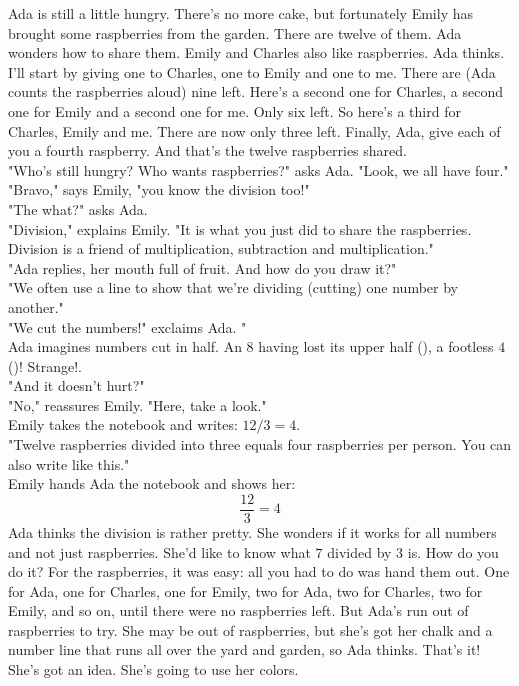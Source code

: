 Ada is still a little hungry.
There's no more cake, but fortunately Emily has brought some raspberries from the garden.
There are twelve of them. Ada wonders how to share them. 
Emily and Charles also like raspberries. 
Ada thinks. I'll start by giving one to Charles, one to Emily and one to me. 
There are (Ada counts the raspberries aloud) nine left. 
Here's a second one for Charles, a second one for Emily and a second one for me. Only six left. 
So here's a third for Charles, Emily and me. There are now only three left. 
Finally, Ada, give each of you a fourth raspberry. And that's the twelve raspberries shared.\\
"Who's still hungry? Who wants raspberries?" asks Ada. "Look, we all have four."\\
"Bravo," says Emily, "you know the division too!"\\
"The what?" asks Ada.\\
"Division," explains Emily. "It is what you just did to share the raspberries. Division is a friend of multiplication, subtraction and multiplication."\\
"Ada replies, her mouth full of fruit. And how do you draw it?"\\
"We often use a line to show that we're dividing (cutting) one number by another."\\
"We cut the numbers!" exclaims Ada. "\\
Ada imagines numbers cut in half. An $8$ having lost its upper half (), a footless $4$ ()! Strange!.\\
"And it doesn't hurt?"\\
"No," reassures Emily. "Here, take a look."\\
Emily takes the notebook and writes: $12/3=4$.\\
"Twelve raspberries divided into three equals four raspberries per person. You can also write like this."\\
Emily hands Ada the notebook and shows her: 
$$\frac{12}{3}=4$$
Ada thinks the division is rather pretty. She wonders if it works for all numbers and not just raspberries. 
She'd like to know what $7$ divided by $3$ is. How do you do it? For the raspberries, it was easy: all you had to do was hand them out. One for Ada, one for Charles, one for Emily, two for Ada, two for Charles, two for Emily, and so on, until there were no raspberries left. 
But Ada's run out of raspberries to try. She may be out of raspberries, but she's got her chalk and a number line that runs all over the yard and garden, so Ada thinks. That's it! She's got an idea. She's going to use her colors.
